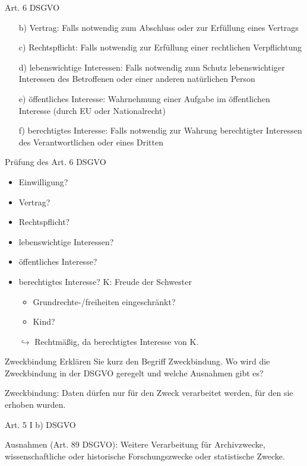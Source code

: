 \documentclass{exercisesheet}
\begin{document}
\begin{solutions}
  \item Art. 6 DSGVO
  \begin{itemize}
    \item[b)] Vertrag: Falls notwendig zum Abschluss oder zur Erfüllung eines Vertrags
    \item[c)] Rechtspflicht: Falls notwendig zur Erfüllung einer rechtlichen Verpflichtung
    \item[d)] lebenswichtige Interessen: Falls notwendig zum Schutz lebenswichtiger Interessen des Betroffenen oder einer anderen natürlichen Person
    \item[e)] öffentliches Interesse: Wahrnehmung einer Aufgabe im öffentlichen Interesse (durch EU oder Nationalrecht)
    \item[f)] berechtigtes Interesse: Falls notwendig zur Wahrung berechtigter Interessen des Verantwortlichen oder eines Dritten
  \end{itemize}
  \item Prüfung des Art. 6 DSGVO
  \begin{itemize}
    \item Einwilligung? \xmark
    \item Vertrag? \xmark
    \item Rechtspflicht? \xmark
    \item lebenswichtige Interessen? \xmark
    \item öffentliches Interesse? \xmark
    \item berechtigtes Interesse? K: Freude der Schwester \checkmark
          \begin{itemize}
            \item Grundrechte-/freiheiten eingeschränkt? \xmark
            \item Kind? \xmark
          \end{itemize}
    \item[$\hookrightarrow$] Rechtmäßig, da berechtigtes Interesse von K.
  \end{itemize}
\end{solutions}

\begin{exercise}{Zweckbindung}
  Erklären Sie kurz den Begriff Zweckbindung. Wo wird die Zweckbindung in der DSGVO geregelt und welche Ausnahmen gibt es?

  \begin{solution}
    Zweckbindung: Daten dürfen nur für den Zweck verarbeitet werden, für den sie erhoben wurden.\par
    Art. 5 I b) DSGVO\par
    Ausnahmen (Art. 89 DSGVO): Weitere Verarbeitung für Archivzwecke, wissenschaftliche oder historische Forschungszwecke oder statistische Zwecke.
  \end{solution}
\end{exercise}
\end{document}
